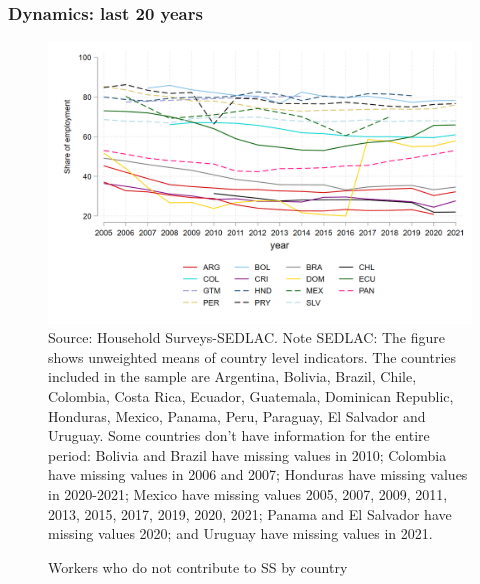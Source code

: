\documentclass{beamer}
\begin{document}
\begin{frame}
\frametitle{Dynamics: last 20 years}
\begin{figure}[!htb]
        \justifying
        \caption{Workers who do not contribute to SS by country}     
        \includegraphics[scale=.2]{latex/figures/Evolution/informal_ss_all.png}
        \label{fig:Evolution_informalSS}
        \footnotesize{Source: Household Surveys-SEDLAC.}
       \footnotesize{Note SEDLAC: The figure shows unweighted means of country level indicators. The countries included in the sample are Argentina, Bolivia, Brazil, Chile, Colombia, Costa Rica, Ecuador, Guatemala, Dominican Republic, Honduras, Mexico, Panama, Peru, Paraguay, El Salvador and Uruguay. Some countries don’t have information for the entire period: Bolivia and Brazil have missing values in 2010; Colombia have missing values in 2006 and 2007; Honduras have missing values in 2020-2021; Mexico have missing values 2005, 2007, 2009, 2011, 2013, 2015, 2017, 2019, 2020, 2021; Panama and El Salvador have missing values 2020; and Uruguay have missing values in 2021.}
 \end{figure}
 \end{frame}
\end{document}

